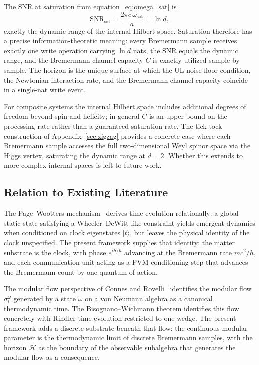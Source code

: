 \documentclass[12pt,a4paper]{article}
\begin{document}
The SNR at saturation from equation~\eqref{eq:omega_sat} is
\begin{equation}
    \mathrm{SNR}_{\mathrm{sat}} 
    = \frac{2\pi c\,\omega_{\mathrm{sat}}}{a} 
    = \ln d,
\end{equation}
exactly the dynamic range of the internal Hilbert 
space. Saturation therefore has a precise 
information-theoretic meaning: every Bremermann 
sample receives exactly one write operation carrying 
$\ln d$ nats, the SNR equals the dynamic range, and 
the Bremermann channel capacity $C$ is exactly 
utilized sample by sample. The horizon is the unique 
surface at which the UL noise-floor condition, the 
Newtonian interaction rate, and the Bremermann channel 
capacity coincide in a single-nat write event.

For composite systems the internal Hilbert space 
includes additional degrees of freedom beyond spin 
and helicity; in general $C$ is an upper bound on 
the processing rate rather than a guaranteed 
saturation rate. The tick-tock construction of 
Appendix~\ref{sec:zigzag} provides a concrete case 
where each Bremermann sample accesses the full 
two-dimensional Weyl spinor space via the Higgs 
vertex, saturating the dynamic range at $d=2$. 
Whether this extends to more complex internal spaces 
is left to future work.


\subsection{Relation to Existing Literature}
\label{sec:literature}

The Page--Wootters mechanism~\cite{page1983evolution,
giovannetti2015quantum} derives time evolution relationally:
a global static state satisfying a Wheeler--DeWitt-like
constraint yields emergent dynamics when conditioned on
clock eigenstates $|t\rangle$, but leaves the physical
identity of the clock unspecified. The present framework
supplies that identity: the matter substrate is the clock,
with phase $e^{iS/\hbar}$ advancing at the Bremermann rate
$mc^2/h$, and each communication unit acting as a PVM
conditioning step that advances the Bremermann count by
one quantum of action.

The modular flow perspective of Connes and
Rovelli~\cite{connes1994neumann} identifies the modular
flow $\sigma_t^\omega$ generated by a state $\omega$ on a
von Neumann algebra as a canonical thermodynamic time. The
Bisognano--Wichmann theorem identifies this flow concretely
with Rindler time evolution restricted to one wedge. The
present framework adds a discrete substrate beneath that
flow: the continuous modular parameter is the thermodynamic
limit of discrete Bremermann samples,
with the horizon $\mathcal{H}$ as the boundary of the 
observable subalgebra that generates the modular flow 
as a consequence.
\end{document}
